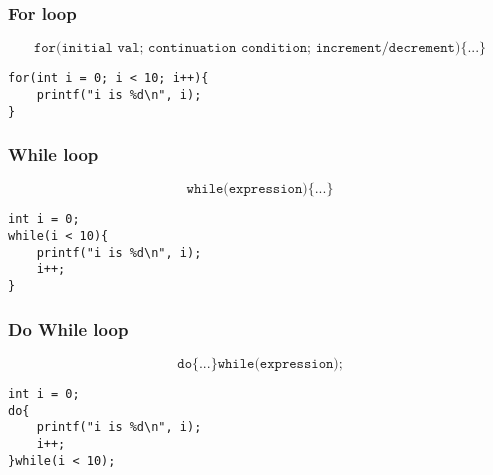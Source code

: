 \documentclass[a4paper, 10pt]{article}
\begin{document}
\subsubsection*{For loop}
$$\texttt{for(initial val; continuation condition; increment/decrement)\{...\}}$$

\begin{lstlisting}[style=cStyle, caption={Print numbers from 0 to 9}]
for(int i = 0; i < 10; i++){
    printf("i is %d\n", i);
}
\end{lstlisting}
\subsubsection*{While loop}
$$\texttt{while(expression)\{...\}}$$
\begin{lstlisting}[style=cStyle, caption={Print numbers from 0 to 9}]
int i = 0;
while(i < 10){
    printf("i is %d\n", i);
    i++;
}
\end{lstlisting}
\subsubsection*{Do While loop}
$$\texttt{do\{...\}while(expression);}$$
\begin{lstlisting}[style=cStyle, caption={Print numbers from 0 to 9}]
int i = 0;
do{
    printf("i is %d\n", i);
    i++;
}while(i < 10);
\end{lstlisting}

\newpage
\end{document}
